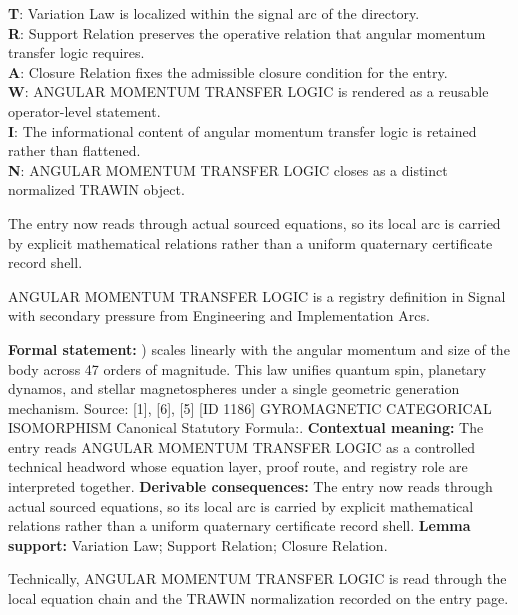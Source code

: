 \begin{minipage}[t]{0.48\linewidth}
\small
\textbf{T}: Variation Law is localized within the signal arc of the directory.\\
\textbf{R}: Support Relation preserves the operative relation that angular momentum transfer logic requires.\\
\textbf{A}: Closure Relation fixes the admissible closure condition for the entry.\\
\textbf{W}: ANGULAR MOMENTUM TRANSFER LOGIC is rendered as a reusable operator-level statement.\\
\textbf{I}: The informational content of angular momentum transfer logic is retained rather than flattened.\\
\textbf{N}: ANGULAR MOMENTUM TRANSFER LOGIC closes as a distinct normalized TRAWIN object.
\normalsize
\end{minipage}

The entry now reads through actual sourced equations, so its local arc is carried by explicit mathematical relations rather than a uniform quaternary certificate record shell.
\clearpage


\begingroup\small
{}
ANGULAR MOMENTUM TRANSFER LOGIC is a registry definition in Signal with secondary pressure from Engineering and Implementation Arcs.

\begingroup\footnotesize\setlength{\emergencystretch}{3em}\sloppy
\textbf{Formal statement:} ) scales linearly with the angular momentum and size of the body across 47 orders of magnitude. This law unifies quantum spin, planetary dynamos, and stellar magnetospheres under a single geometric generation mechanism. Source: [1], [6], [5] [ID 1186] GYROMAGNETIC CATEGORICAL ISOMORPHISM Canonical Statutory Formula:. \textbf{Contextual meaning:} The entry reads ANGULAR MOMENTUM TRANSFER LOGIC as a controlled technical headword whose equation layer, proof route, and registry role are interpreted together. \textbf{Derivable consequences:} The entry now reads through actual sourced equations, so its local arc is carried by explicit mathematical relations rather than a uniform quaternary certificate record shell. \textbf{Lemma support:} Variation Law; Support Relation; Closure Relation.\par
\endgroup

Technically, ANGULAR MOMENTUM TRANSFER LOGIC is read through the local equation chain and the TRAWIN normalization recorded on the entry page.


